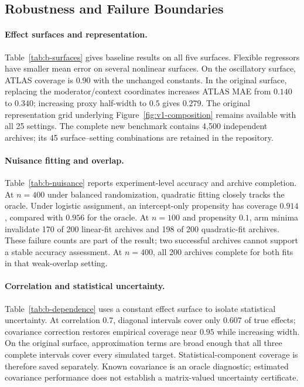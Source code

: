 \subsection{Robustness and Failure Boundaries}
\label{app:robustness}
\label{app:representation-sensitivity}

\paragraph{Effect surfaces and representation.}
Table~\ref{tab:b-surfaces} gives baseline results on all five surfaces. Flexible regressors have smaller mean error on several nonlinear surfaces. On the oscillatory surface, ATLAS coverage is $0.90$ with the unchanged constants. In the original surface, replacing the moderator/context coordinates increases ATLAS MAE from $0.140$ to $0.340$; increasing proxy half-width to $0.5$ gives $0.279$. The original representation grid underlying Figure~\ref{fig:v1-composition} remains available with all 25 settings. The complete new benchmark contains 4,500 independent archives; its 45 surface--setting combinations are retained in the repository.


\paragraph{Nuisance fitting and overlap.}
Table~\ref{tab:b-nuisance} reports experiment-level accuracy and archive completion. At $n=400$ under balanced randomization, quadratic fitting closely tracks the oracle. Under logistic assignment, an intercept-only propensity has coverage $0.914$, compared with $0.956$ for the oracle. At $n=100$ and propensity $0.1$, arm minima invalidate 170 of 200 linear-fit archives and 198 of 200 quadratic-fit archives. These failure counts are part of the result; two successful archives cannot support a stable accuracy assessment. At $n=400$, all 200 archives complete for both fits in that weak-overlap setting.


\paragraph{Correlation and statistical uncertainty.}
Table~\ref{tab:b-dependence} uses a constant effect surface to isolate statistical uncertainty. At correlation $0.7$, diagonal intervals cover only $0.607$ of true effects; covariance correction restores empirical coverage near $0.95$ while increasing width. On the original surface, approximation terms are broad enough that all three complete intervals cover every simulated target. Statistical-component coverage is therefore saved separately. Known covariance is an oracle diagnostic; estimated covariance performance does not establish a matrix-valued uncertainty certificate.



